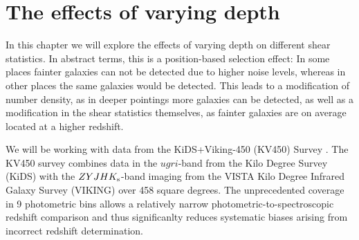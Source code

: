 \chapter{The effects of varying depth}
\label{sec:eff_of_var_depth}
In this chapter we will explore the effects of varying depth on different shear statistics. In abstract terms, this is a position-based selection effect: In some places fainter galaxies can not be detected due to higher noise levels, whereas in other places the same galaxies would be detected. This leads to a modification of number density, as in deeper pointings more galaxies can be detected, as well as a modification in the shear statistics themselves, as fainter galaxies are on average located at a higher redshift.

We will be working with data from the KiDS+Viking-450 (KV450) Survey \citep{2018arXiv181206077W}. The KV450 survey combines data in the $ugri$-band from the Kilo Degree Survey (KiDS) with the $ZYJHK_{\rm s}$-band imaging from the VISTA Kilo Degree Infrared Galaxy Survey (VIKING) over 458 square degrees. The unprecedented coverage in 9 photometric bins allows a relatively narrow photometric-to-spectroscopic redshift comparison and thus significanlty reduces systematic biases arising from incorrect redshift determination.

